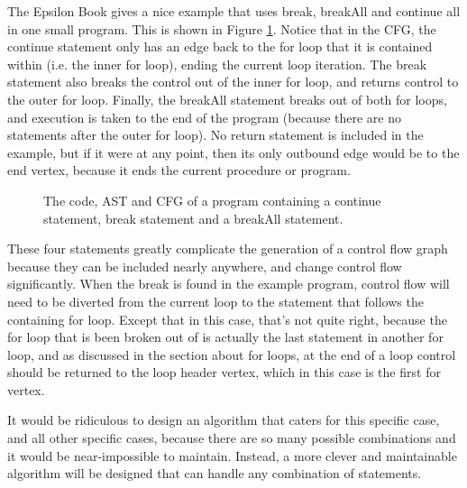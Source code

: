 The Epsilon Book \citep{epsilonBook} gives a nice example that uses break, breakAll and continue all in one small program. This is shown in Figure \ref{fig:break}. Notice that in the CFG, the continue statement only has an edge back to the for loop that it is contained within (i.e. the inner for loop), ending the current loop iteration. The break statement also breaks the control out of the inner for loop, and returns control to the outer for loop. Finally, the breakAll statement breaks out of both for loops, and execution is taken to the end of the program (because there are no statements after the outer for loop). No return statement is included in the example, but if it were at any point, then its only outbound edge would be to the end vertex, because it ends the current procedure or program.

\begin{figure}
\centering
\begin{minipage}{.6\textwidth}
  \centering
  
\end{minipage}%
\begin{minipage}{.3\textwidth}
  \centering
\end{minipage}
\caption{The code, AST and CFG of a program containing a continue statement, break statement and a breakAll statement.}
\label{fig:break}
\end{figure}

These four statements greatly complicate the generation of a control flow graph because they can be included nearly anywhere, and change control flow significantly. When the break is found in the example program, control flow will need to be diverted from the current loop to the statement that follows the containing for loop. Except that in this case, that's not quite right, because the for loop that is been broken out of is actually the last statement in another for loop, and as discussed in the section about for loops, at the end of a loop control should be returned to the loop header vertex, which in this case is the first for vertex.

It would be ridiculous to design an algorithm that caters for this specific case, and all other specific cases, because there are so many possible combinations and it would be near-impossible to maintain. Instead, a more clever and maintainable algorithm will be designed that can handle any combination of statements.